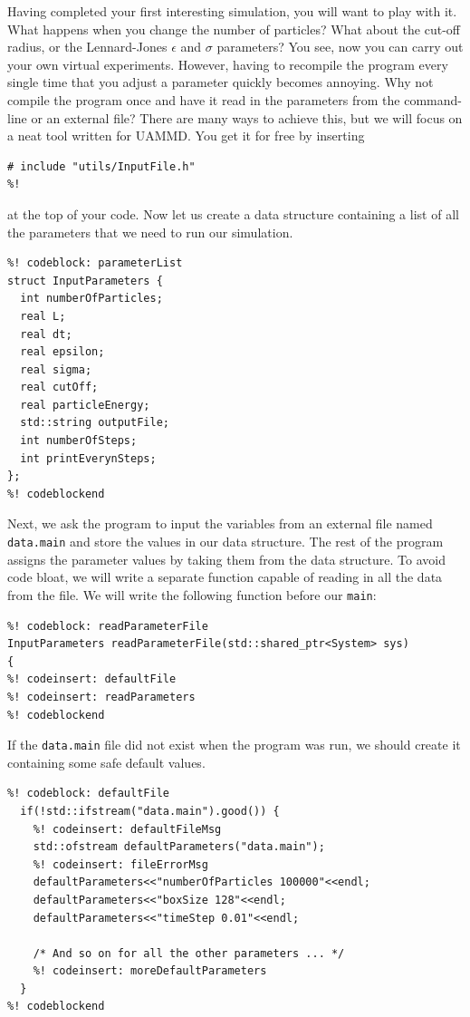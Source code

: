Having completed your first interesting simulation, you will want to play with
it. What happens when you change the number of particles? What about the cut-off
radius, or the Lennard-Jones $\epsilon$ and $\sigma$ parameters? You see, now
you can carry out your own virtual experiments. However, having to recompile the
program every single time that you adjust a parameter quickly becomes annoying.
Why not compile the program once and have it read in the parameters from the
command-line or an external file? There are many ways to achieve this, but we
will focus on a neat tool written for UAMMD. You get it for free by inserting
\begin{lstlisting}
# include "utils/InputFile.h"
%!
\end{lstlisting}
at the top of your code. Now let us create a data structure containing a list of
all the parameters that we need to run our simulation.
\begin{lstlisting}
%! codeblock: parameterList
struct InputParameters {
  int numberOfParticles;
  real L;
  real dt;
  real epsilon;
  real sigma;
  real cutOff;
  real particleEnergy;
  std::string outputFile;
  int numberOfSteps;
  int printEverynSteps;
};
%! codeblockend
\end{lstlisting}
Next, we ask the program to input the variables from an external file named
\texttt{data.main} and store the values in our data structure. The rest of the
program assigns the parameter values by taking them from the data structure.
To avoid code bloat, we will write a separate function capable of reading in
all the data from the file. We will write the following function before our
\texttt{main}:
\begin{lstlisting}
%! codeblock: readParameterFile
InputParameters readParameterFile(std::shared_ptr<System> sys)
{
%! codeinsert: defaultFile
%! codeinsert: readParameters
%! codeblockend
\end{lstlisting}
If the \texttt{data.main} file did not exist when the program was run, we should
create it containing some safe default values.
\begin{lstlisting}
%! codeblock: defaultFile
  if(!std::ifstream("data.main").good()) {
    %! codeinsert: defaultFileMsg
    std::ofstream defaultParameters("data.main");
    %! codeinsert: fileErrorMsg
    defaultParameters<<"numberOfParticles 100000"<<endl;
    defaultParameters<<"boxSize 128"<<endl;
    defaultParameters<<"timeStep 0.01"<<endl;

    /* And so on for all the other parameters ... */
    %! codeinsert: moreDefaultParameters
  }
%! codeblockend
\end{lstlisting}

